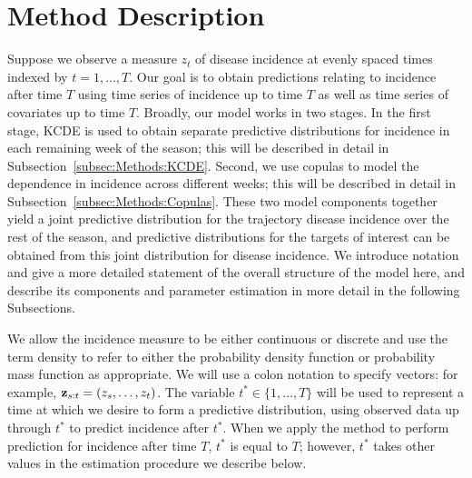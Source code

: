 \documentclass[times, doublespace]{simauth}\usepackage[]{graphicx}\usepackage[]{color}
\begin{document}
\section{Method Description}
\label{sec:Methods}

Suppose we observe a measure $z_t$ of disease incidence at evenly spaced times
indexed by $t = 1, \ldots, T$.  Our goal is to obtain predictions relating to
incidence after time $T$ using time series of incidence up to time $T$
as well as time series of covariates up to time $T$.
Broadly, our model works in two stages.
In the first stage, KCDE is used to obtain separate predictive distributions for
incidence in each remaining week of the season; this will be described in detail in Subsection~\ref{subsec:Methods:KCDE}.
Second, we use copulas to model the dependence in incidence across different weeks; this will be described in detail in Subsection~\ref{subsec:Methods:Copulas}.
These two model components together yield a joint predictive distribution for the trajectory disease incidence over the rest of the season, and predictive distributions for the targets of interest can be obtained from this joint distribution for disease incidence.
We introduce notation and give a more detailed statement of the overall structure of the model here,
and describe its components and parameter estimation in more detail in the following Subsections.

We allow the incidence measure to be either
continuous or discrete and use the term density to refer to either the probability density function or probability mass function as appropriate.  We will use a colon notation to
specify vectors: for example, ${\bf z}_{s:t} = (z_s, \ldots, z_t)$.  The
variable $t^* \in \{1, \ldots, T\}$ will be used to represent a time at which we
desire to form a predictive distribution, using observed data up through $t^*$
to predict incidence after $t^*$.  When we apply the method to
perform prediction for incidence after time $T$, $t^*$ is equal to $T$; however, $t^*$
takes other values in the estimation procedure we describe below.
\end{document}
